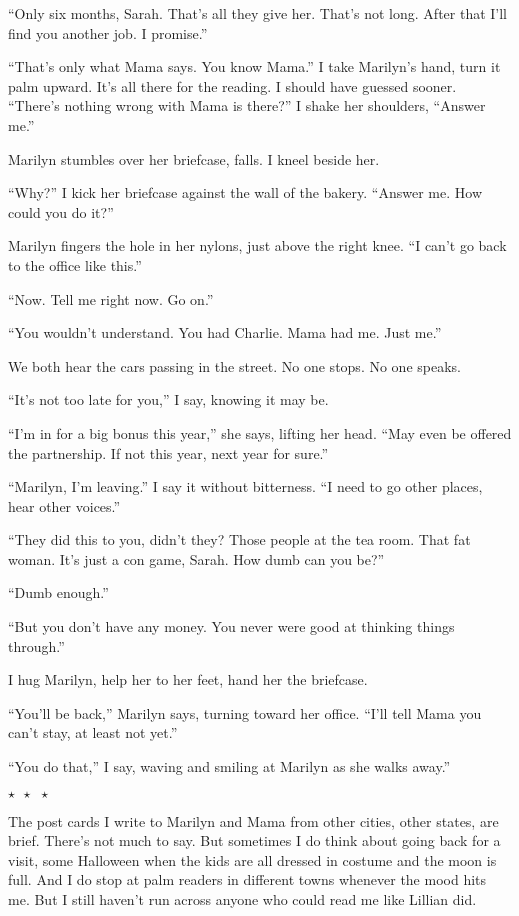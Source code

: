 \documentclass[twoside,10pt]{book}
\begin{document}
``Only six months, Sarah. That's all they give her. That's not long.
After that I'll find you another job. I promise.''

``That's only what Mama says. You know Mama.'' I take Marilyn's hand,
turn it palm upward. It's all there for the reading. I should have
guessed sooner. ``There's nothing wrong with Mama is there?'' I shake
her shoulders, ``Answer me.''

Marilyn stumbles over her briefcase, falls. I kneel beside her.

``Why?'' I kick her briefcase against the wall of the bakery. ``Answer
me. How could you do it?''

Marilyn fingers the hole in her nylons, just above the right knee. ``I
can't go back to the office like this.''

``Now. Tell me right now. Go on.''

``You wouldn't understand. You had Charlie. Mama had me. Just me.''

We both hear the cars passing in the street. No one stops. No one
speaks.

``It's not too late for you,'' I say, knowing it may be.

``I'm in for a big bonus this year,'' she says, lifting her head. ``May
even be offered the partner­ship. If not this year, next year for
sure.''

``Marilyn, I'm leaving.'' I say it without bitterness. ``I need to go
other places, hear other voices.''

``They did this to you, didn't they? Those people at the tea room. That
fat woman. It's just a con game, Sarah. How dumb can you be?''

``Dumb enough.''

``But you don't have any money. You never were good at thinking things
through.''

I hug Marilyn, help her to her feet, hand her the briefcase.

``You'll be back,'' Marilyn says, turning toward her office. ``I'll tell
Mama you can't stay, at least not yet.''

``You do that,'' I say, waving and smiling at Marilyn as she walks
away.''

{
  \large
\begin{center}
  $\star \ \ \star \ \ \star$
\end{center}
}

The post cards I write to Marilyn and Mama from other cities, other
states, are brief. There's not much to say. But sometimes I do think
about going back for a visit, some Halloween when the kids are all
dressed in costume and the moon is full. And I do stop at palm readers
in different towns whenever the mood hits me. But I still haven't run
across anyone who could read me like Lillian did.
\end{document}
